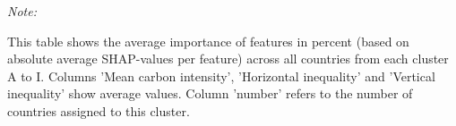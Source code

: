 \begin{table}[H]
{\begin{threeparttable}
\begin{tabular}[t]{lrrrrrrrrrrrrrrrrrrrr}
\bottomrule
\end{tabular}
\begin{tablenotes}
\item \textit{Note: } 
\item This table shows the average importance of features in percent (based on absolute average SHAP-values per feature) across all countries from each cluster A to I. Columns 'Mean carbon intensity', 'Horizontal inequality' and 'Vertical inequality' show average values. Column 'number' refers to the number of countries assigned to this cluster.
\end{tablenotes}
\end{threeparttable}}
\end{table}
